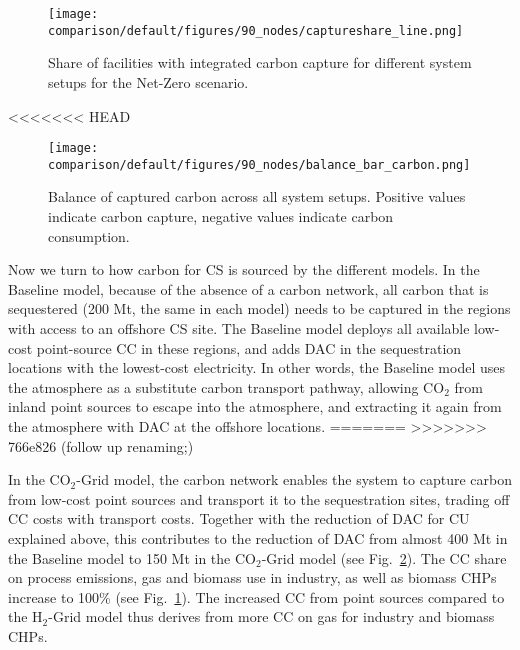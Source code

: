 \documentclass[twocolumn]{article}
\newcommand{\CO}{CO$_2$}
\newcommand{\modBase}{Baseline model}
\newcommand{\modCO}{CO$_2$-Grid model}
\newcommand{\modH}{H$_2$-Grid model}
\begin{document}
\begin{figure}[h]
    \centering
    \texttt{[image: comparison/default/figures/90\_nodes/captureshare\_line.png]}
    \caption{Share of facilities with integrated carbon capture for different system setups for the Net-Zero scenario.}
    \label{fig:captureshare_line}
\end{figure}%

<<<<<<< HEAD
\begin{figure}[ht!]
    \centering
    \texttt{[image: comparison/default/figures/90\_nodes/balance\_bar\_carbon.png]}
    \caption{Balance of captured carbon across all system setups. Positive values indicate carbon capture, negative values indicate carbon consumption.}
    \label{fig:balance_captured_carbon}
\end{figure}

Now we turn to how carbon for CS is sourced by the different models. In the \modBase{}, because of the absence of a carbon network, all carbon that is sequestered (200 Mt, the same in each model) needs to be captured in the regions with access to an offshore CS site. The \modBase{} deploys all available low-cost point-source CC in these regions, and adds DAC in the sequestration locations with the lowest-cost electricity. In other words, the \modBase{} uses the atmosphere as a substitute carbon transport pathway, allowing \CO{} from inland point sources to escape into the atmosphere, and extracting it again from the atmosphere with DAC at the offshore locations.
=======
>>>>>>> 766e826 (follow up renaming;)

In the \modCO{}, the carbon network enables the system to capture carbon from low-cost point sources and transport it to the sequestration sites, trading off CC costs with transport costs. Together with the reduction of DAC for CU explained above, this contributes to the reduction of DAC from almost \label{}400 Mt in the Baseline model to \label{}150 Mt in the \modCO{} (see Fig.~\ref{fig:balance_captured_carbon}). The CC share on process emissions, gas and biomass use in industry, as well as biomass CHPs increase to 100\% (see Fig.~\ref{fig:captureshare_line}). The increased CC from point sources compared to the \modH{} thus derives from more CC on gas for industry and biomass CHPs.
\end{document}
